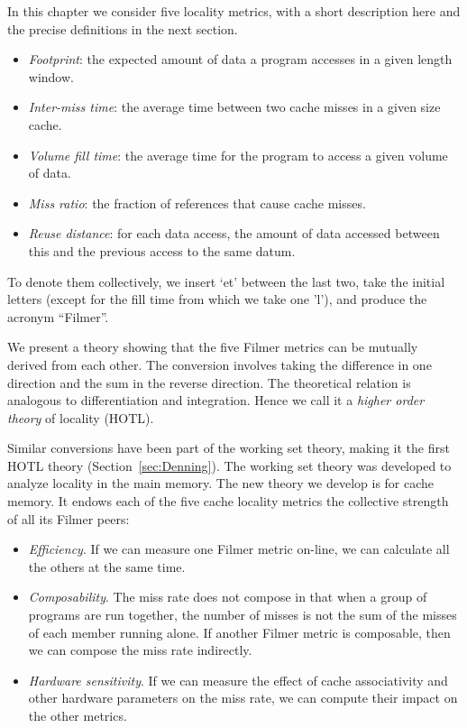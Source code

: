 In this chapter we consider five locality metrics, with a short description
here and the precise definitions in the next section.

\begin{itemize}
\item \emph{Footprint}: the expected amount of data a program accesses
  in a given length window.
\item \emph{Inter-miss time}: the average time between two cache
  misses in a given size cache.
\item \emph{Volume fill time}: the average time for the program to
  access a given volume of data.
\item \emph{Miss ratio}: the fraction of references that cause cache
  misses.
\item \emph{Reuse distance}: for each data access, the amount of data
  accessed between this and the previous access to the same datum.
\end{itemize}

\noindent To denote them collectively, we insert `et' between the last
two,  take the initial letters (except for the fill time from which we
take one 'l'), and produce the acronym ``Filmer''. 

We present a theory showing that the five Filmer
metrics can be mutually derived from each other.  The conversion
involves taking the difference in one direction and the sum in the
reverse direction.  The theoretical relation is analogous to
differentiation and  integration.  Hence we call it a \emph{higher
  order theory} of locality (HOTL).

Similar conversions have been part of the working set theory, making
it the first HOTL theory (Section~\ref{sec:Denning}).  The working set
theory was developed to analyze locality in the main memory.  The new
theory we develop is for cache memory.  It endows each of the five cache locality
metrics the collective strength of all its Filmer peers:

\begin{itemize}
\item \emph{Efficiency}.  If we can measure one
  Filmer metric on-line, we can calculate all the others at the same
  time.
\item \emph{Composability}.  The miss rate does not compose in that
  when a group of programs are run together, the number of misses is
  not the sum of the misses of each member running alone.  If another
  Filmer metric is composable, then we can compose the miss rate
  indirectly.
\item \emph{Hardware sensitivity}.  If we can measure the effect of
  cache associativity and other hardware parameters on the miss rate,
  we can compute their impact on the other metrics.
\end{itemize}

